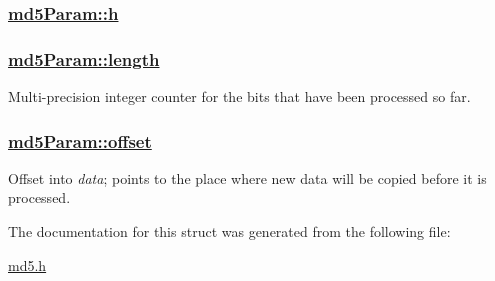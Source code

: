 \hypertarget{structmd5Param_o0}{
\subsubsection[h]{\setlength{\rightskip}{0pt plus 5cm}\hyperlink{structmd5Param_o0}{md5Param::h}}}
\label{structmd5Param_o0}


\hypertarget{structmd5Param_o2}{
\subsubsection[length]{\setlength{\rightskip}{0pt plus 5cm}\hyperlink{structmd5Param_o2}{md5Param::length}}}
\label{structmd5Param_o2}


Multi-precision integer counter for the bits that have been processed so far. 

\hypertarget{structmd5Param_o3}{
\subsubsection[offset]{\setlength{\rightskip}{0pt plus 5cm}\hyperlink{structmd5Param_o3}{md5Param::offset}}}
\label{structmd5Param_o3}


Offset into {\em data\/}; points to the place where new data will be copied before it is processed. 



The documentation for this struct was generated from the following file:\begin{CompactItemize}
\item 
\hyperlink{md5_8h}{md5.h}\end{CompactItemize}
